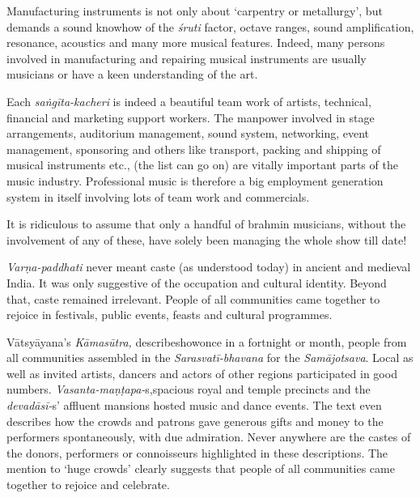 Manufacturing instruments is not only about ‘carpentry or metall\-urgy’, but demands a sound knowhow of the \textit{śruti} factor, octave ranges, sound amplification, resonance, acoustics and many more musical features. Indeed, many persons involved in manufacturing and repairing musical instruments are usually musicians or have a keen understanding of the art.

Each \textit{saṅgīta-kacheri} is indeed a beautiful team work of artists, technical, financial and marketing support workers. The manpower involved in stage arrangements, auditorium management, sound system, networking, event management, sponsoring and others like transport, packing and shipping of musical instruments etc., (the list can go on) are vitally important parts of the music industry. Professional music is therefore a big employment generation system in itself involving lots of team work and commercials.

It is ridiculous to assume that only a handful of brahmin musicians, without the involvement of any of these, have solely been managing the whole show till date!

\textit{Varṇa-paddhati} never meant caste (as understood today) in ancient and medieval India. It was only suggestive of the occupation and cultural identity. Beyond that, caste remained irrelevant. People of all communities came together to rejoice in festivals, public events, feasts and cultural programmes.

Vātsyāyana’s \textit{Kāmasūtra,} describeshowonce in a fortnight or month, people from all communities assembled in the \textit{Sarasvatī-bhavana} for the \textit{Samājotsava}. Local as well as invited artists, dancers and actors of other regions participated in good numbers. \textit{Vasanta-maṇṭapa-}s,\break spacious royal and temple precincts and the \textit{devadāsī-}s’ affluent mansions hosted music and dance events. The text even describes how the crowds and patrons gave generous gifts and money to the performers spontaneously, with due admiration. Never anywhere are the castes of the donors, performers or connoisseurs highlighted in these descriptions. The mention to ‘huge crowds’ clearly suggests that people of all communities came together to rejoice and celebrate.

